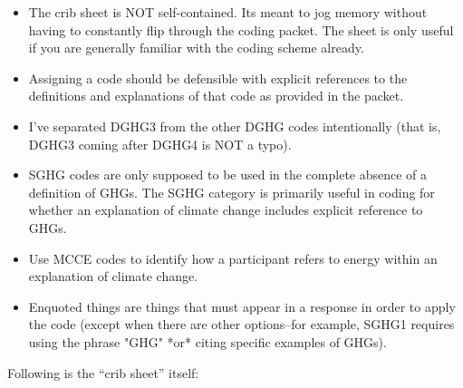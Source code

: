 \begin{itemize}
\item The crib sheet is NOT self-contained. Its meant to jog memory
without having to constantly flip through the coding packet. The sheet
is only useful if you are generally familiar with the coding scheme
already.

\item Assigning a code should be defensible with explicit references to
the definitions and explanations of that code as provided in the
packet.

\item I've separated DGHG3 from the other DGHG codes intentionally (that
is, DGHG3 coming after DGHG4 is NOT a typo).

\item SGHG codes are only supposed to be used in the complete absence of a
definition of GHGs. The SGHG category is primarily useful in coding
for whether an explanation of climate change includes explicit
reference to GHGs.

\item Use MCCE codes to identify how a participant refers to energy within
an explanation of climate change.

\item Enquoted things are things that must appear in a response in order
to apply the code (except when there are other options--for example,
SGHG1 requires using the phrase "GHG" *or* citing specific examples of
GHGs).
\end{itemize}

Following is the “crib sheet” itself:

